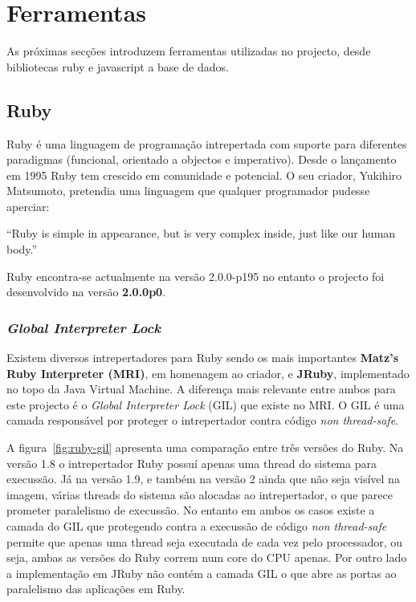 \section{Ferramentas}

As próximas secções introduzem ferramentas utilizadas no projecto, desde bibliotecas ruby e javascript a base de dados.

\subsection{Ruby}

Ruby é uma linguagem de programação intrepertada com suporte para diferentes paradigmas (funcional, orientado a objectos e imperativo). Desde o lançamento em 1995 Ruby tem crescido em comunidade e potencial. O seu criador, Yukihiro Matsumoto, pretendia uma linguagem que qualquer programador pudesse aperciar:

``Ruby is simple in appearance, but is very complex inside, just like our human body.'' \cite{matz}

Ruby encontra-se actualmente na versão 2.0.0-p195 no entanto o projecto foi desenvolvido na versão \textbf{2.0.0p0}.

\subsubsection{\textit{Global Interpreter Lock}}
\label{sec:gil}

Existem diversos intrepertadores para Ruby sendo os mais importantes \textbf{Matz's Ruby Interpreter (MRI)}, em homenagem ao criador, e \textbf{JRuby}, implementado no topo da Java Virtual Machine. 
A diferença mais relevante entre ambos para este projecto é o \textit{Global Interpreter Lock} (GIL) que existe no MRI. O GIL é uma camada responsável por proteger o intrepertador contra código \textit{non thread-safe}.

A figura~\ref{fig:ruby-gil} apresenta uma comparação entre três versões do Ruby. Na versão 1.8 o intrepertador Ruby possuí apenas uma thread do sistema para execussão. Já na versão 1.9, e também na versão 2 ainda que não seja visível na imagem, várias threads do sistema são alocadas ao intrepertador, o que parece prometer paralelismo de execussão. No entanto em ambos os casos existe a camada do GIL que protegendo contra a execussão de código \textit{non thread-safe} permite que apenas uma thread seja executada de cada vez pelo processador, ou seja, ambas as versões do Ruby correm num core do CPU apenas.
Por outro lado a implementação em JRuby não contém a camada GIL o que abre as portas ao paralelismo das aplicações em Ruby.

